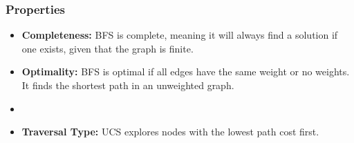 \subsubsection*{Properties}
\begin{itemize}
    \item \textbf{Completeness:} BFS is complete, meaning it will always find a solution if one exists, given that the graph is finite.
    \item \textbf{Optimality:} BFS is optimal if all edges have the same weight or no weights. It finds the shortest path in an unweighted graph.
    \item \item \textbf{Traversal Type:} UCS explores nodes with the lowest path cost first.
\end{itemize}